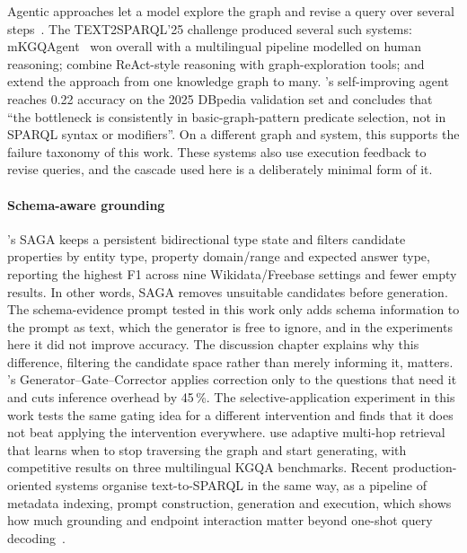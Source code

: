 Agentic approaches let a model explore the graph and revise a query over several steps~\citep{liu2024spinach}.
The TEXT2SPARQL'25 challenge produced several such systems: mKGQAgent~\citep{perevalov2025mkgqagent} won overall with a multilingual pipeline modelled on human reasoning; \citet{brei2025aruqula} combine ReAct-style reasoning with graph-exploration tools; and \citet{walter2025grasp} extend the approach from one knowledge graph to many.
\citet{soru2026researcher}'s self-improving agent reaches 0.22 accuracy on the 2025 DBpedia validation set and concludes that ``the bottleneck is consistently in basic-graph-pattern predicate selection, not in SPARQL syntax or modifiers''.
On a different graph and system, this supports the failure taxonomy of this work.
These systems also use execution feedback to revise queries, and the cascade used here is a deliberately minimal form of it.

\paragraph{Schema-aware grounding}

\citet{zhang2026saga}'s SAGA keeps a persistent bidirectional type state and filters candidate properties by entity type, property domain/range and expected answer type, reporting the highest F1 across nine Wikidata/Freebase settings and fewer empty results.
In other words, SAGA removes unsuitable candidates before generation.
The schema-evidence prompt tested in this work only adds schema information to the prompt as text, which the generator is free to ignore, and in the experiments here it did not improve accuracy.
The discussion chapter explains why this difference, filtering the candidate space rather than merely informing it, matters.
\citet{yang2026ggc}'s Generator--Gate--Corrector applies correction only to the questions that need it and cuts inference overhead by 45\,\%.
The selective-application experiment in this work tests the same gating idea for a different intervention and finds that it does not beat applying the intervention everywhere.
\citet{srivastava2026mars} use adaptive multi-hop retrieval that learns when to stop traversing the graph and start generating, with competitive results on three multilingual KGQA benchmarks.
Recent production-oriented systems organise text-to-SPARQL in the same way, as a pipeline of metadata indexing, prompt construction, generation and execution, which shows how much grounding and endpoint interaction matter beyond one-shot query decoding~\citep{smeros2025sparqlllm}.

